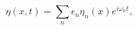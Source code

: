 \begin{equation}
\label{E12} \eta (x,t) = \sum_n \epsilon_n \eta_n (x) e^{i\omega_n t},
\end{equation}

